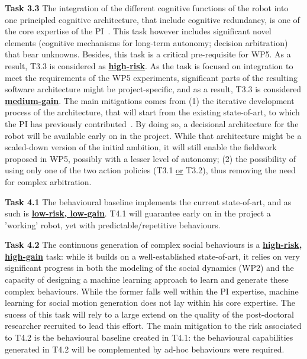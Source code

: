 \documentclass[11pt,a4paper]{report}
\begin{document}
\textbf{Task 3.3} The integration of the different cognitive functions of the
robot into one principled cognitive architecture, that include cognitive
redundancy, is one of the core expertise of the
PI~\cite{lemaignan2017artificial}. This task however includes significant novel
elements (cognitive mechanisms for long-term autonomy; decision arbitration)
that bear unknowns. Besides, this task is a critical pre-requisite for WP5. As a
result, T3.3 is considered as \ul{\bf high-risk}. As the task is focused on
integration to meet the requirements of the WP5 experiments, significant parts
of the resulting software architecture might be project-specific, and as a
result, T3.3 is considered \ul{\bf medium-gain}. The main mitigations comes from
(1) the
iterative development process of the architecture, that will start from the existing
state-of-art, to which the PI has previously
contributed~\cite{lemaignan2017artificial}. By doing so, a decisional
architecture for the robot will be available early on in the project. While that
architecture might be a scaled-down version of the initial ambition, it will
still enable the fieldwork proposed in WP5, possibly with a lesser level of
autonomy; (2) the possibility of using only one of the two action policies (T3.1
\ul{or} T3.2), thus removing the need for complex arbitration.

\vspace{1em}

\textbf{Task 4.1} The behavioural baseline implements the current state-of-art,
and as such is \ul{\bf low-risk, low-gain}. T4.1 will guarantee early on in the
project a 'working' robot, yet with predictable/repetitive behaviours.

\textbf{Task 4.2} The continuous generation of complex social behaviours is a
\ul{\bf high-risk, high-gain} task: while it builds on a well-established
state-of-art, it relies on very significant progress in both the modeling of the
social dynamics (WP2) and the capacity of designing a machine learning approach
to learn and generate these complex behaviours. While the former falls well
within the PI expertise, machine learning for social motion generation does not
lay within his core expertise. The sucess of this task will rely to a large
extend on the quality of the post-doctoral researcher recruited to lead this
effort. The main mitigation to the risk associated to T4.2 is the behavioural
baseline created in T4.1: the behavioural capabilities generated in T4.2 will be
complemented by ad-hoc behaviours were required.
\end{document}
